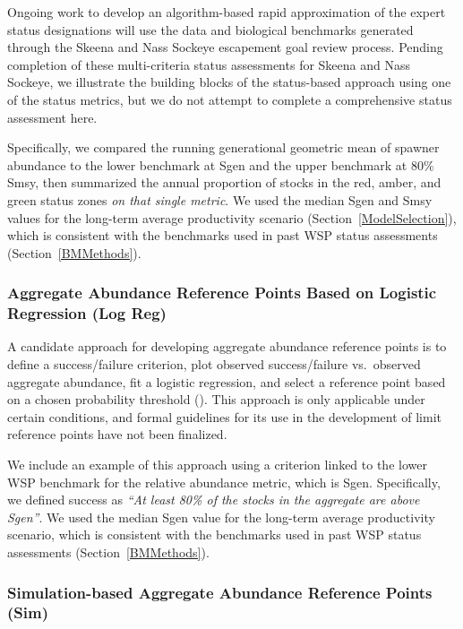 \documentclass[french,11pt]{book}
\begin{document}
Ongoing work to develop an algorithm-based rapid approximation of the expert status designations will use the data and biological benchmarks generated through the Skeena and Nass Sockeye escapement goal review process. Pending completion of these multi-criteria status assessments for Skeena and Nass Sockeye, we illustrate the building blocks of the status-based approach using one of the status metrics, but we do not attempt to complete a comprehensive status assessment here.

Specifically, we compared the running generational geometric mean of spawner abundance to the lower benchmark at Sgen and the upper benchmark at 80\% Smsy, then summarized the annual proportion of stocks in the red, amber, and green status zones \emph{on that single metric}. We used the median Sgen and Smsy values for the long-term average productivity scenario (Section~\ref{ModelSelection}), which is consistent with the benchmarks used in past WSP status assessments (Section~\ref{BMMethods}).

\subsubsection{Aggregate Abundance Reference Points Based on Logistic Regression (Log Reg)}\label{aggregate-abundance-reference-points-based-on-logistic-regression-log-reg}

A candidate approach for developing aggregate abundance reference points is to define a success/failure criterion, plot observed success/failure vs.~observed aggregate abundance, fit a logistic regression, and select a reference point based on a chosen probability threshold (). This approach is only applicable under certain conditions, and formal guidelines for its use in the development of limit reference points have not been finalized.

We include an example of this approach using a criterion linked to the lower WSP benchmark for the relative abundance metric, which is Sgen. Specifically, we defined success as \emph{``At least 80\% of the stocks in the aggregate are above Sgen''}. We used the median Sgen value for the long-term average productivity scenario, which is consistent with the benchmarks used in past WSP status assessments (Section~\ref{BMMethods}).

\subsubsection{Simulation-based Aggregate Abundance Reference Points (Sim)}\label{SimMethodsGeneral}
\end{document}
